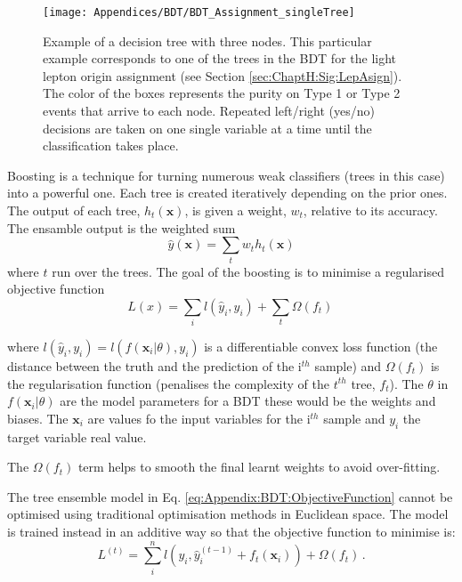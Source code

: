 \begin{figure}
\centering
  \centering
  \texttt{[image: Appendices/BDT/BDT\_Assignment\_singleTree]}
\caption{Example of a decision tree with three nodes. This particular example corresponds to one of the trees in the BDT for the 
light lepton origin assignment (see Section \ref{sec:ChaptH:Sig:LepAsign}). The color of the boxes represents the purity on Type 1 or Type 2 events that arrive to each node. Repeated left/right (yes/no) decisions are taken on one single variable at
a time until the classification takes place.}
\label{fig:Appendix:BDT:TreeExample}
\end{figure}

Boosting is a technique for turning numerous weak classifiers (trees in this case) into a powerful one. 
Each tree is created iteratively depending on the prior ones. The output of each tree, $h_{t}(\bm{x})$, is given a weight, $w_{t}$,
relative to its accuracy. The ensamble output is the weighted sum
\begin{equation*}
	\hat{y} (\bm{x}) = \sum_{t} w_{t}h_{t}(\bm{x})
\end{equation*}
where $t$ run over the trees. The goal of the boosting is to minimise a regularised objective function
\begin{equation}
\label{eq:Appendix:BDT:ObjectiveFunction}
	L (x) = \sum_{i} l(\hat{y}_{i}, y_{i})+ \sum_{t}\Omega(f_{t}) \,
\end{equation}

where $l(\hat{y}_{i}, y_{i})=l(f(\bm{x}_{i}|\theta), y_{i})$ is a differentiable convex
 loss function (the distance between the truth and the prediction of the i$^{th}$ sample) and
$\Omega(f_{t})$ is the regularisation function (penalises the complexity of the $t^{th}$ tree, $f_t$).
The $\theta$ in $f(\bm{x}_{i}|\theta)$ are the model parameters for a BDT these would be the weights
and biases. The $\bm{x}_i$ are values fo the input 
variables for the i$^{th}$ sample and $y_{i}$ the target variable real value. 

The $\Omega(f_{t})$ term helps to smooth the final learnt weights to avoid
over-fitting. %


The tree ensemble model in Eq. \ref{eq:Appendix:BDT:ObjectiveFunction} cannot be optimised using 
traditional optimisation methods in Euclidean space. 
The model is trained instead in an additive way so that the objective function to minimise is:
\begin{equation}
\label{eq:Appendix:BDT:ObjectiveFunction_alternative}
	L^{(t)} =  \sum_{i}^n l(y_i, \hat{y}_i^{(t-1)} + f_t(\bm{x}_i)) + \Omega (f_t) \,.
\end{equation}

